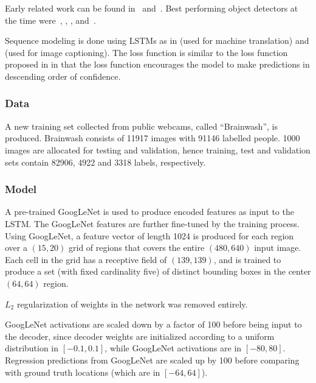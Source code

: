 \documentclass[a4paper, 12pt]{article}
\begin{document}
Early related work can be found in~\cite{Felzenszwalb:2010:ODD:1850486.1850574}
and~\cite{Leibe:2005:PDC:1068507.1069006}. Best performing object detectors at
the time were~\cite{DBLP:journals/corr/GirshickDDM13},
\cite{DBLP:journals/corr/SermanetEZMFL13}, \cite{Uijlings13},
\cite{DBLP:journals/corr/ZhangBS15} and~\cite{DBLP:journals/corr/SzegedyREA14}.

Sequence modeling is done using LSTMs as in
\cite{DBLP:journals/corr/SutskeverVL14} (used for machine translation) and
\cite{DBLP:journals/corr/KarpathyF14} (used for image captioning). The loss
function is similar to the loss function proposed in
\cite{Graves06connectionisttemporal} in that the loss function encourages the
model to make predictions in descending order of confidence.

\subsubsection{Data}

A new training set collected from public webcams, called ``Brainwash'', is
produced. Brainwash consists of 11917 images with 91146 labelled people. 1000
images are allocated for testing and validation, hence training, test and
validation sets contain 82906, 4922 and 3318 labels, respectively.

\subsubsection{Model}

A pre-trained GoogLeNet\cite{going-deeper-szegedy43022} is used to produce
encoded features as input to the LSTM\@. The GoogLeNet features are further
fine-tuned by the training process.  Using GoogLeNet, a feature vector of
length 1024 is produced for each region over a $(15, 20)$ grid of regions that
covers the entire $(480, 640)$ input image. Each cell in the grid has a
receptive field of $(139, 139)$, and is trained to produce a set (with fixed
cardinality five) of distinct bounding boxes in the center $(64, 64)$ region.

$L_2$ regularization of weights in the network was removed entirely.

GoogLeNet activations are scaled down by a factor of 100 before being input to
the decoder, since decoder weights are initialized according to a uniform
distribution in $[-0.1, 0.1]$, while GoogLeNet activations are in $[-80, 80]$.
Regression predictions from GoogLeNet are scaled up by 100 before comparing
with ground truth locations (which are in $[-64, 64]$).
\end{document}
